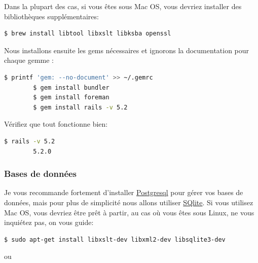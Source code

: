 \documentclass[]{report}
\begin{document}
        Dans la plupart des cas, si vous êtes sous Mac OS, vous devriez installer des bibliothèques supplémentaires:

        \begin{scriptsize}
        \begin{lstlisting}[language=bash]
        $ brew install libtool libxslt libksba openssl
        \end{lstlisting}
        \end{scriptsize}

        Nous installons ensuite les gems nécessaires et ignorons la documentation pour chaque gemme :

        \begin{scriptsize}
        \begin{lstlisting}[language=bash]
        $ printf 'gem: --no-document' >> ~/.gemrc
        $ gem install bundler
        $ gem install foreman
        $ gem install rails -v 5.2
        \end{lstlisting}
        \end{scriptsize}

        Vérifiez que tout fonctionne bien:

        \begin{scriptsize}
        \begin{lstlisting}[language=bash]
        $ rails -v 5.2
        5.2.0
        \end{lstlisting}
        \end{scriptsize}

      \subsubsection{Bases de données}

        Je vous recommande fortement d'installer \href{http://www.postgresql.org/}{Postgresql} pour gérer vos bases de données, mais pour plus de simplicité nous allons utiliser \href{http://www.sqlite.org/}{SQlite}. Si vous utilisez Mac OS, vous devriez être prêt à partir, au cas où vous êtes sous Linux, ne vous inquiétez pas, on vous guide:

        \begin{scriptsize}
        \begin{lstlisting}[language=bash]
        $ sudo apt-get install libxslt-dev libxml2-dev libsqlite3-dev
        \end{lstlisting}
        \end{scriptsize}

        ou
\end{document}
